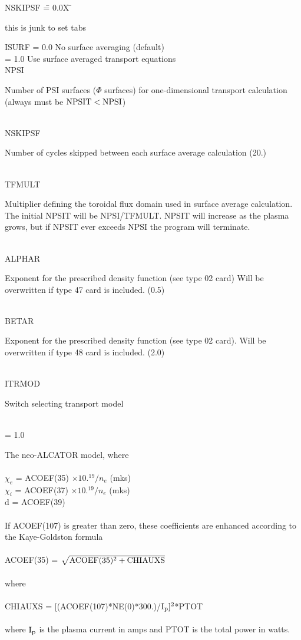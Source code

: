 \begin{tabbing} 
NSKIPSF \= = 0.0X \= \parbox[t]{\width}{this is junk to set tabs} \kill 
ISURF   \> = 0.0 \>No surface averaging (default)\\ 
        \> = 1.0 \>Use surface averaged transport equations\\ 
NPSI  \>   \> \parbox[t]{\width}{Number of PSI surfaces ($\Phi$ surfaces) for one-dimensional transport 
calculation (always must be $\rm NPSIT < NPSI$)}\\ 
NSKIPSF \> \> \parbox[t]{\width}{Number of cycles skipped between each surface average
calculation (20.)}\\ 
TFMULT \> \> \parbox[t]{\width}{Multiplier defining the toroidal flux domain used in surface
average calculation.  The initial NPSIT will be NPSI/TFMULT.  NPSIT will increase as the plasma grows,
but if NPSIT ever exceeds NPSI the program will terminate. }\\ 
ALPHAR \> \> \parbox[t]{\width}{Exponent for the prescribed density function (see type 02 card)
Will be overwritten if type 47 card is included. (0.5)}\\ 
BETAR \>  \> \parbox[t]{\width}{Exponent for the prescribed density function (see type 02
card). 
Will be overwritten if type 48 card is included. (2.0)}\\ 
ITRMOD \>  \> \parbox[t]{\width}{Switch selecting transport model}\\ 
\> = 1.0 \> \parbox[t]{\width}{The neo-ALCATOR model, where \\  
 \\ 
$\chi_e$ = ACOEF(35) $\times 10.^{19} /n_e$ (mks)\\ 
$\chi_i$ = ACOEF(37) $\times 10.^{19}/n_e$ (mks)\\ 
d = ACOEF(39)\\ 
\\ 
If ACOEF(107) is greater than zero, these coefficients are enhanced according to the
Kaye-Goldston formula\\ 
 \\ 
ACOEF(35) = $\sqrt{{\rm ACOEF(35)^2 + CHIAUXS}}$\\  
 \\ 
where\\ 
 \\ 
CHIAUXS = [(ACOEF(107)*NE(0)*300.)/$\rm I_p ]^2$*PTOT\\ 
 \\ 
where $\rm I_p$ is the plasma current in amps and PTOT is the total power in watts.}\\

\end{tabbing}
